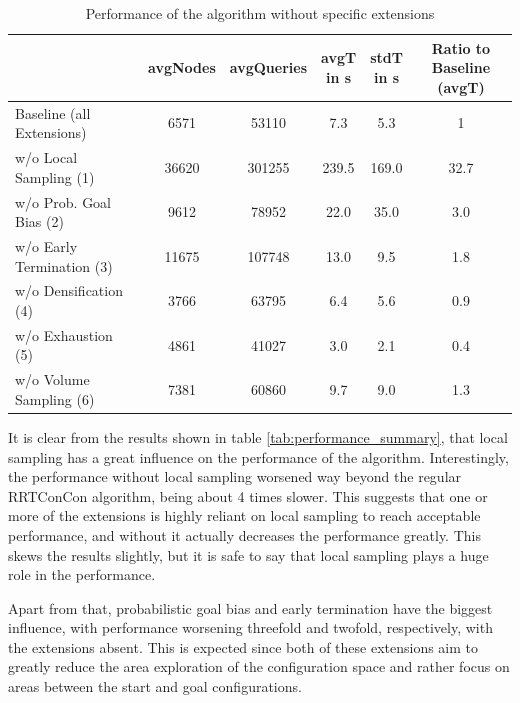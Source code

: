 \documentclass[a4paper,12pt]{article}
\begin{document}
\begin{table}[H]
    \centering
    \begin{tabular}{|l|c|c|c|c|c|}
        \hline
                   & avgNodes & avgQueries &  \shortstack{avgT\\in s} & \shortstack{stdT\\in s} & \shortstack{Ratio to Baseline \\ (avgT)} \\
        \hline 
        Baseline (all Extensions) & 6571 & 53110 & 7.3 & 5.3 & 1 \\  
        \hline
        w/o Local Sampling (1) & 36620 & 301255 &  239.5 & 169.0 & 32.7 \\
        w/o Prob. Goal Bias (2) & 9612 & 78952 &  22.0 & 35.0 & 3.0 \\
        w/o Early Termination (3) & 11675 & 107748 &  13.0 & 9.5 & 1.8 \\
        w/o Densification (4) & 3766 & 63795 &  6.4 & 5.6 & 0.9 \\
        w/o Exhaustion (5) & 4861 & 41027 &  3.0 & 2.1 & 0.4 \\ 
        w/o Volume Sampling (6) & 7381 & 60860 & 9.7 & 9.0 & 1.3 \\
    \hline
    \end{tabular}
    \caption{Performance of the algorithm without specific extensions}
    \label{tab:ablation_study}
\end{table}

It is clear from the results shown in table \ref{tab:performance_summary}, that local sampling has a great influence on the performance of the algorithm. Interestingly, the performance without local sampling worsened way beyond the regular RRTConCon algorithm, being about 4 times slower. This suggests that one or more of the extensions is highly reliant on local sampling to reach acceptable performance, and without it actually decreases the performance greatly. This skews the results slightly, but it is safe to say that local sampling plays a huge role in the performance.

Apart from that, probabilistic goal bias and early termination have the biggest influence, with performance worsening threefold and twofold, respectively, with the extensions absent.  This is expected since both of these extensions aim to greatly reduce the area exploration of the configuration space and rather focus on areas between the start and goal configurations. 
\end{document}
